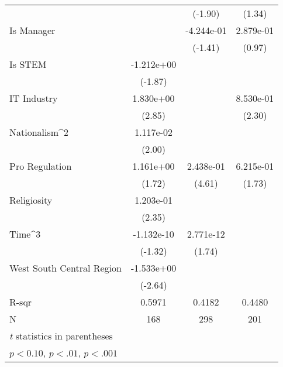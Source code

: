 {\begin{tabular}{l*{3}{c}}
                         &                     &     (-1.90)         &      (1.34)         \\
\addlinespace
Is Manager               &                     &  -4.244e-01         &   2.879e-01         \\
                         &                     &     (-1.41)         &      (0.97)         \\
\addlinespace
Is STEM                  &  -1.212e+00\sym{*}  &                     &                     \\
                         &     (-1.87)         &                     &                     \\
\addlinespace
IT Industry              &   1.830e+00\sym{**} &                     &   8.530e-01\sym{*}  \\
                         &      (2.85)         &                     &      (2.30)         \\
\addlinespace
Nationalism^2            &   1.117e-02\sym{*}  &                     &                     \\
                         &      (2.00)         &                     &                     \\
\addlinespace
Pro Regulation           &   1.161e+00\sym{*}  &   2.438e-01\sym{***}&   6.215e-01\sym{*}  \\
                         &      (1.72)         &      (4.61)         &      (1.73)         \\
\addlinespace
Religiosity              &   1.203e-01\sym{*}  &                     &                     \\
                         &      (2.35)         &                     &                     \\
\addlinespace
Time^3                   &  -1.132e-10         &   2.771e-12\sym{*}  &                     \\
                         &     (-1.32)         &      (1.74)         &                     \\
\addlinespace
West South Central Region&  -1.533e+00\sym{**} &                     &                     \\
                         &     (-2.64)         &                     &                     \\
\midrule
R-sqr                    &      0.5971         &      0.4182         &      0.4480         \\
N                        &         168         &         298         &         201         \\
\bottomrule
\multicolumn{4}{l}{\footnotesize \textit{t} statistics in parentheses}\\
\multicolumn{4}{l}{\footnotesize \sym{*} \(p<0.10\), \sym{**} \(p<.01\), \sym{***} \(p<.001\)}\\
\end{tabular}
}
